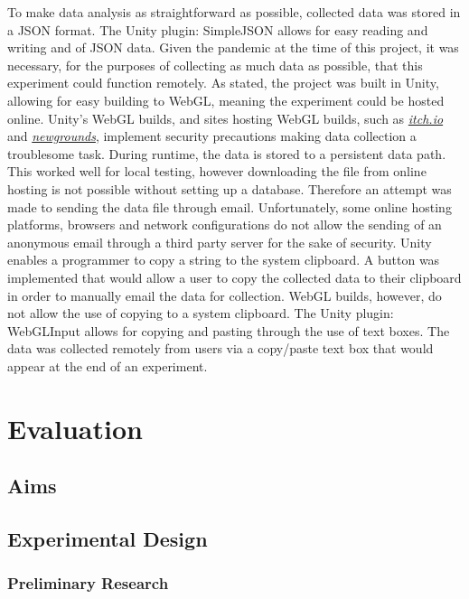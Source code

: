 \documentclass{l4proj}
\begin{document}
To make data analysis as straightforward as possible, collected data was stored in a JSON format. The Unity plugin: SimpleJSON \citep{bunny83_simplejson_nodate} allows for easy reading and writing and of JSON data.
Given the pandemic at the time of this project, it was necessary, for the purposes of collecting as much data as possible, that this experiment could function remotely. As stated, the project was built in Unity, allowing for easy building to WebGL, meaning the experiment could be hosted online. Unity's WebGL builds, and sites hosting WebGL builds, such as \href{https://itch.io/}{\textit{itch.io}} and \href{https://www.newgrounds.com/}{\textit{newgrounds}}, implement security precautions making data collection a troublesome task.
During runtime, the data is stored to a persistent data path. This worked well for local testing, however downloading the file from online hosting is not possible without setting up a database.
Therefore an attempt was made to sending the data file through email. Unfortunately, some online hosting platforms, browsers and network configurations do not allow the sending of an anonymous email through a third party server for the sake of security. 
Unity enables a programmer to copy a string to the system clipboard. A button was implemented that would allow a user to copy the collected data to their clipboard in order to manually email the data for collection. WebGL builds, however, do not allow the use of copying to a system clipboard. The Unity plugin: WebGLInput \citep{kou-yeung_webglinput_nodate} allows for copying and pasting through the use of text boxes.
The data was collected remotely from users via a copy/paste text box that would appear at the end of an experiment.

\chapter{Evaluation} 

\section{Aims} 

\section{Experimental Design}

\subsection{Preliminary Research}
\end{document}
